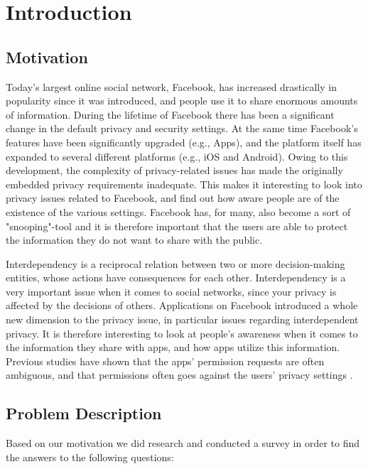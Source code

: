 \chapter{Introduction}
\label{chp:introduction} 

\section{Motivation}
Today's largest online social network, Facebook, has increased drastically in popularity since it was introduced, and people use it to share enormous amounts of information. During the lifetime of Facebook there has been a significant change in the default privacy and security settings. At the same time Facebook's features have been significantly upgraded (e.g., Apps), and the platform itself has expanded to several different platforms (e.g., iOS and Android). Owing to this development, the complexity of privacy-related issues has made the originally embedded privacy requirements inadequate. This makes it interesting to look into privacy issues related to Facebook, and find out how aware people are of the existence of the various settings. Facebook has, for many, also become a sort of "snooping"-tool and it is therefore important that the users are able to protect the information they do not want to share with the public.

Interdependency is a reciprocal relation between two or more decision-making entities, whose actions have consequences for each other. Interdependency is a very important issue when it comes to social networks, since your privacy is affected by the decisions of others. Applications on Facebook introduced a whole new dimension to the privacy issue, in particular issues regarding interdependent privacy. It is therefore interesting to look at people's awareness when it comes to the information they share with apps, and how apps utilize this information. Previous studies have shown that the apps' permission requests are often ambiguous, and that permissions often goes against the users' privacy settings \cite{thirdPartyApps}.  


\section{Problem Description}
Based on our motivation we did research and conducted a survey in order to find the answers to the following questions: 

